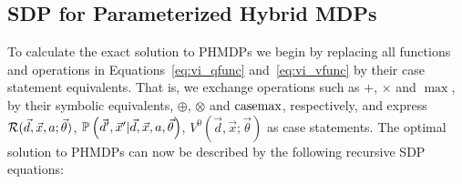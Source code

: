 
\subsection{SDP for Parameterized Hybrid MDPs}

To calculate the exact solution to PHMDPs we begin by replacing all functions and operations in Equations~\eqref{eq:vi_qfunc} and~\eqref{eq:vi_vfunc} by their case statement equivalents. That is, we exchange operations such as {\footnotesize$+$}, {\footnotesize$\times$} and {\footnotesize$\max$}, by their symbolic equivalents, {\footnotesize$\oplus$}, {\footnotesize$\otimes$} and $\mathrm{casemax}$, respectively, and express {\footnotesize $\mathcal{R}(\vec{d}, \vec{x}, a; \vec{\theta})$},  {\footnotesize $\mathbb{P}\left({\vec{d}', \vec{x}' | \vec{d}, \vec{x}, a, \vec{\theta}}\right)$}, {\footnotesize $V^0(\vec{d}, \vec{x}; \vec{\theta})$} as case statements. The optimal solution to PHMDPs can now be described by the following recursive SDP equations:

